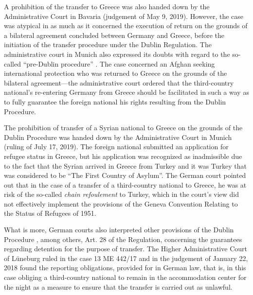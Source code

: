 \documentclass[10pt,a4paper]{article}
\begin{document}
\begin{multicols}{2}
A prohibition of the transfer to Greece was also handed down by the Administrative Court in Bavaria (judgement of May 9, 2019). However, the case was atypical in as much as it concerned the execution of return on the grounds of a bilateral agreement concluded between Germany and Greece, before the initiation of the transfer procedure under the Dublin Regulation. The administrative court in Munich also expressed its doubts with regard to the so-called ``pre-Dublin procedure'' \citep{R96}. The case concerned an Afghan seeking international protection who was returned to Greece on the grounds of the bilateral agreement---the administrative court ordered that the third-country national's re-entering Germany from Greece should be facilitated in such a way as to fully guarantee the foreign national his rights resulting from the Dublin Procedure.

The prohibition of transfer of a Syrian national to Greece on the grounds of the Dublin Procedure was handed down by the Administrative Court in Munich (ruling of July 17, 2019). The foreign national submitted an application for refugee status in Greece, but his application was recognized as inadmissible due to the fact that the Syrian arrived in Greece from Turkey and it was Turkey that was considered to be ``The First Country of Asylum''. The German court pointed out that in the case of a transfer of a third-country national to Greece, he was at risk of the so-called \textit{chain refoulement} to Turkey, which in the court's view did not effectively implement the provisions of the Geneva Convention Relating to the Status of Refugees of 1951.

What is more, German courts also interpreted other provisions of the Dublin Procedure \citep{R97}, among others, Art. 28 of the Regulation, concerning the guarantees regarding detention for the purpose of transfer. The Higher Administrative Court of Lüneburg ruled in the case 13 ME 442/17 and in the judgement of January 22, 2018 found the reporting obligations, provided for in German law, that is, in this case obliging a third-country national to remain in the accommodation center for the night as a measure to ensure that the transfer is carried out as unlawful.


\end{multicols}
\end{document}
